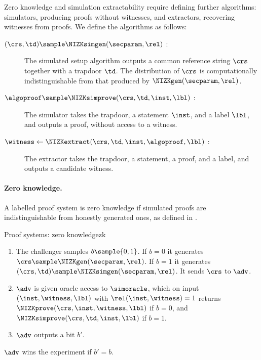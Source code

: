 Zero knowledge and simulation extractability require defining further
algorithms: simulators, producing proofs without witnesses, and extractors,
recovering witnesses from proofs. We define the algorithms as follows:

\begin{description}

  \item[$(\crs, \td) \sample \NIZKsimgen(\secparam, \rel)$ :] The simulated setup
algorithm outputs a common reference string $\crs$ together with a trapdoor
$\td$.  The distribution of $\crs$ is computationally indistinguishable from
that produced by $\NIZKgen(\secparam, \rel)$.

  \item[$\algoproof \sample \NIZKsimprove(\crs, \td, \inst, \lbl)$ :] The
simulator takes the trapdoor, a statement $\inst$, and a label $\lbl$, and
outputs a proof, without access to a witness.

  \item[$\witness \leftarrow \NIZKextract(\crs, \td, \inst, \algoproof, \lbl)$
:] The extractor takes the trapdoor, a statement, a proof, and a label, and
outputs a candidate witness.

\end{description}

\paragraph{Zero knowledge.} A labelled proof system is zero knowledge if simulated
proofs are indistinguishable from honestly generated ones, as defined in
.

\begin{experimentbox}{Proof systems: zero knowledge}{zk}

  \begin{enumerate}

    \item The challenger samples $b \sample \{0,1\}$.  If $b = 0$ it generates
$\crs \sample \NIZKgen(\secparam, \rel)$. If $b = 1$ it generates $(\crs, \td)
\sample \NIZKsimgen(\secparam, \rel)$.  It sends $\crs$ to $\adv$.

    \item $\adv$ is given oracle access to $\simoracle$, which on input $(\inst,
\witness, \lbl)$ with $\rel(\inst, \witness) = 1$ returns $\NIZKprove(\crs,
\inst, \witness, \lbl)$ if $b = 0$, and $\NIZKsimprove(\crs, \td, \inst, \lbl)$
if $b = 1$.

    \item $\adv$ outputs a bit $b'$.

  \end{enumerate}

  $\adv$ wins the experiment if $b' = b$.

\end{experimentbox}

